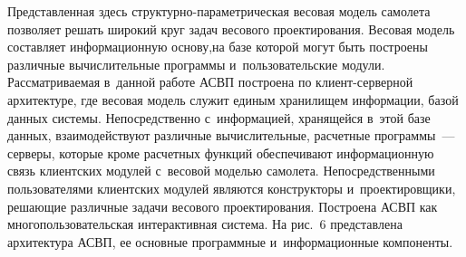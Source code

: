 \begin{multicols}{2}
  Представленная здесь струк\-тур\-но-па\-ра\-мет\-ри\-че\-ская весовая модель 
самолета позволяет решать широкий круг задач весового проектирования. 
Весовая модель составляет информационную основу,\linebreak на базе которой могут 
быть построены различные вычислительные программы и~пользовательские 
модули. Рассматриваемая в~данной работе АСВП построена по 
кли\-ент-сер\-вер\-ной архитектуре, где весовая модель служит единым хранилищем 
информации, базой данных системы. Непосредственно с~информацией, 
хранящейся в~этой базе данных, взаимодействуют различные вычислительные, 
расчетные программы~--- серверы, которые кроме расчетных функций 
обеспечивают информационную связь клиентских модулей с~весовой моделью 
самолета. Непосредственными пользователями клиентских модулей являются 
конструкторы и~проектировщики, решающие различные задачи весового 
проектирования.  Построена АСВП как многопользовательская интерактивная 
система. На рис.~6 представлена архитектура АСВП, ее основные программные 
и~информационные компоненты.





\end{multicols}
